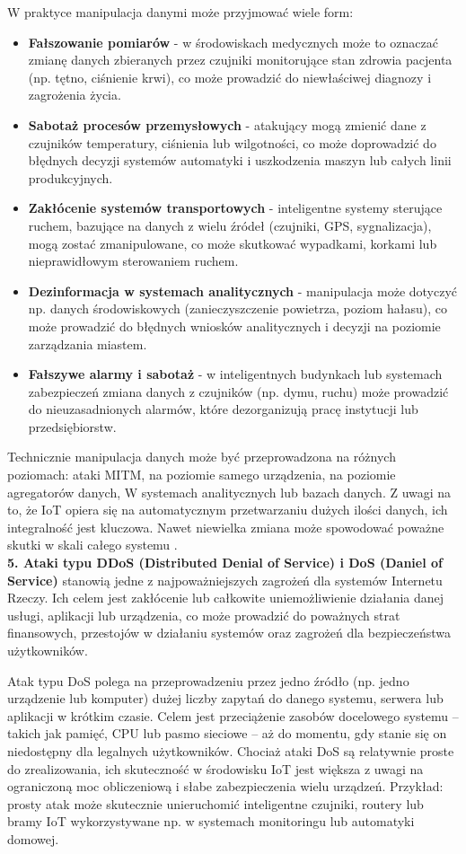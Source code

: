 W praktyce manipulacja danymi może przyjmować wiele form:
\begin{itemize}
    \item \textbf{Fałszowanie pomiarów} - w środowiskach medycznych może to oznaczać zmianę danych zbieranych przez czujniki monitorujące stan zdrowia pacjenta (np. tętno, ciśnienie krwi), co może prowadzić do niewłaściwej diagnozy i zagrożenia życia.
    \item \textbf{Sabotaż procesów przemysłowych} - atakujący mogą zmienić dane z czujników temperatury, ciśnienia lub wilgotności, co może doprowadzić do błędnych decyzji systemów automatyki i uszkodzenia maszyn lub całych linii produkcyjnych.
    \item \textbf{Zakłócenie systemów transportowych} - inteligentne systemy sterujące ruchem, bazujące na danych z wielu źródeł (czujniki, GPS, sygnalizacja), mogą zostać zmanipulowane, co może skutkować wypadkami, korkami lub nieprawidłowym sterowaniem ruchem.
    \item \textbf{Dezinformacja w systemach analitycznych} - manipulacja może dotyczyć np. danych środowiskowych (zanieczyszczenie powietrza, poziom hałasu), co może prowadzić do błędnych wniosków analitycznych i decyzji na poziomie zarządzania miastem.
    \item \textbf{Fałszywe alarmy i sabotaż} - w inteligentnych budynkach lub systemach zabezpieczeń zmiana danych z czujników (np. dymu, ruchu) może prowadzić do nieuzasadnionych alarmów, które dezorganizują pracę instytucji lub przedsiębiorstw.
\end{itemize}
Technicznie manipulacja danych może być przeprowadzona na różnych poziomach: ataki MITM, na poziomie samego urządzenia, na poziomie agregatorów danych, W systemach analitycznych lub bazach danych. Z uwagi na to, że IoT opiera się na automatycznym przetwarzaniu dużych ilości danych, ich integralność jest kluczowa. Nawet niewielka zmiana może spowodować poważne skutki w skali całego systemu \cite{schneier2018}.
\vspace{10pt} \\
\textbf{5. Ataki typu DDoS (Distributed Denial of Service) i DoS (Daniel of Service)} stanowią jedne z najpoważniejszych zagrożeń dla systemów Internetu Rzeczy. Ich celem jest zakłócenie lub całkowite uniemożliwienie działania danej usługi, aplikacji lub urządzenia, co może prowadzić do poważnych strat finansowych, przestojów w działaniu systemów oraz zagrożeń dla bezpieczeństwa użytkowników. 

Atak typu DoS polega na przeprowadzeniu przez jedno źródło (np. jedno urządzenie lub komputer) dużej liczby zapytań do danego systemu, serwera lub aplikacji w krótkim czasie. Celem jest przeciążenie zasobów docelowego systemu – takich jak pamięć, CPU lub pasmo sieciowe – aż do momentu, gdy stanie się on niedostępny dla legalnych użytkowników. Chociaż ataki DoS są relatywnie proste do zrealizowania, ich skuteczność w środowisku IoT jest większa z uwagi na ograniczoną moc obliczeniową i słabe zabezpieczenia wielu urządzeń. Przykład: prosty atak może skutecznie unieruchomić inteligentne czujniki, routery lub bramy IoT wykorzystywane np. w systemach monitoringu lub automatyki domowej.

